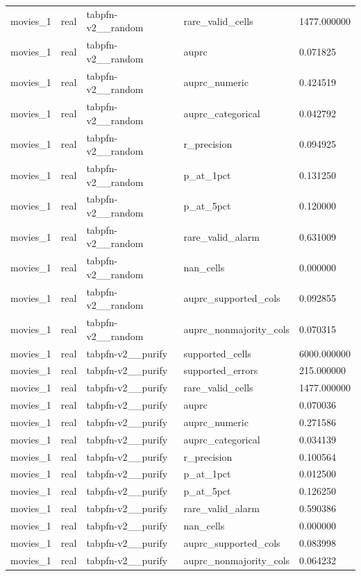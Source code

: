 \begin{tabular}{lllll}
movies\_1 & real & tabpfn-v2\_\_random & rare\_valid\_cells & 1477.000000 \\
movies\_1 & real & tabpfn-v2\_\_random & auprc & 0.071825 \\
movies\_1 & real & tabpfn-v2\_\_random & auprc\_numeric & 0.424519 \\
movies\_1 & real & tabpfn-v2\_\_random & auprc\_categorical & 0.042792 \\
movies\_1 & real & tabpfn-v2\_\_random & r\_precision & 0.094925 \\
movies\_1 & real & tabpfn-v2\_\_random & p\_at\_1pct & 0.131250 \\
movies\_1 & real & tabpfn-v2\_\_random & p\_at\_5pct & 0.120000 \\
movies\_1 & real & tabpfn-v2\_\_random & rare\_valid\_alarm & 0.631009 \\
movies\_1 & real & tabpfn-v2\_\_random & nan\_cells & 0.000000 \\
movies\_1 & real & tabpfn-v2\_\_random & auprc\_supported\_cols & 0.092855 \\
movies\_1 & real & tabpfn-v2\_\_random & auprc\_nonmajority\_cols & 0.070315 \\
movies\_1 & real & tabpfn-v2\_\_purify & supported\_cells & 6000.000000 \\
movies\_1 & real & tabpfn-v2\_\_purify & supported\_errors & 215.000000 \\
movies\_1 & real & tabpfn-v2\_\_purify & rare\_valid\_cells & 1477.000000 \\
movies\_1 & real & tabpfn-v2\_\_purify & auprc & 0.070036 \\
movies\_1 & real & tabpfn-v2\_\_purify & auprc\_numeric & 0.271586 \\
movies\_1 & real & tabpfn-v2\_\_purify & auprc\_categorical & 0.034139 \\
movies\_1 & real & tabpfn-v2\_\_purify & r\_precision & 0.100564 \\
movies\_1 & real & tabpfn-v2\_\_purify & p\_at\_1pct & 0.012500 \\
movies\_1 & real & tabpfn-v2\_\_purify & p\_at\_5pct & 0.126250 \\
movies\_1 & real & tabpfn-v2\_\_purify & rare\_valid\_alarm & 0.590386 \\
movies\_1 & real & tabpfn-v2\_\_purify & nan\_cells & 0.000000 \\
movies\_1 & real & tabpfn-v2\_\_purify & auprc\_supported\_cols & 0.083998 \\
movies\_1 & real & tabpfn-v2\_\_purify & auprc\_nonmajority\_cols & 0.064232 \\

\end{tabular}
